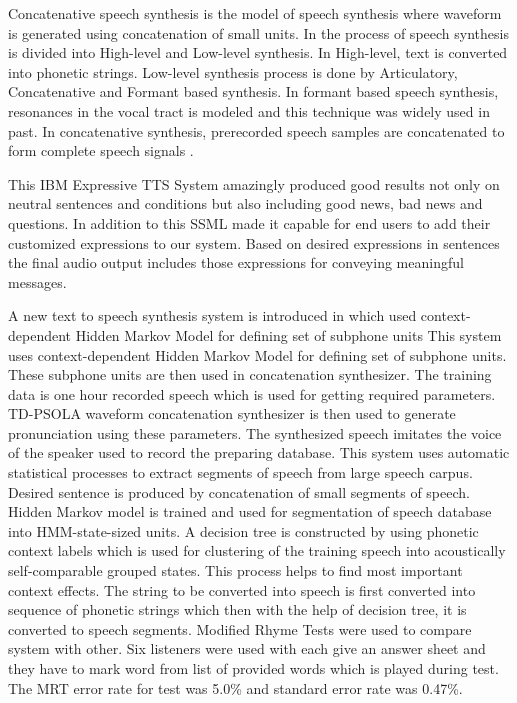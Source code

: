 Concatenative speech synthesis is the model of speech synthesis where waveform is generated using concatenation of small units. In \cite{lemmetty1999review} the process of speech synthesis is divided into High-level and Low-level synthesis. In High-level, text is converted into phonetic strings. Low-level synthesis process is done by Articulatory, Concatenative and Formant based synthesis. In formant based speech synthesis, resonances in the vocal tract is modeled and this technique was widely used in
past. In concatenative synthesis, prerecorded speech samples are concatenated to form complete speech signals \cite{pickett1999acoustics}.

This IBM Expressive TTS System amazingly produced good results not only on neutral sentences and conditions but also
including good news, bad news and questions. In addition to this SSML made it capable for end users to add their customized
expressions to our system. Based on desired expressions in sentences the final audio output includes those expressions for
conveying meaningful messages.

A new text to speech synthesis system is introduced in \cite{donovan1995improvements} which used context-dependent Hidden Markov Model
for defining set of subphone units This system uses context-dependent Hidden Markov Model for defining set of subphone units. These subphone units are then used in concatenation synthesizer. The training data is one hour recorded speech which is used for getting required parameters. TD-PSOLA waveform concatenation synthesizer is then used to generate pronunciation using these parameters. The synthesized speech imitates the voice of the speaker used to record the preparing database. This system uses automatic statistical processes to extract segments of speech from large speech carpus. Desired sentence is produced by concatenation of small
segments of speech. Hidden Markov model is trained and used for segmentation of speech database into HMM-state-sized
units. A decision tree is constructed by using phonetic context labels which is used for clustering of the training speech into
acoustically self-comparable grouped states. This process helps to find most important context effects. The string to be
converted into speech is first converted into sequence of phonetic strings which then with the help of decision tree, it is
converted to speech segments. Modified Rhyme Tests \cite{house1965articulation} were used to compare system
with other. Six listeners were used with each give an answer sheet and they have to mark word from list of provided words
which is played during test. The MRT error rate for test was 5.0\% and standard error rate was 0.47\%.


